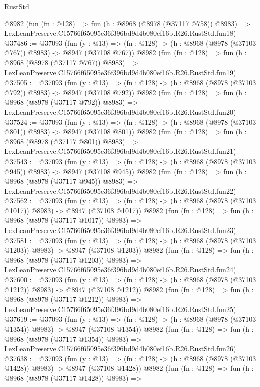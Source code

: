 \begin{lexlean}{RustStd}
\begin{coremodule}
    @8982
    (fun (fn : @128) =>
    fun (h : @8968 (@8978 (@37117 @758)) @8983) =>
    LexLeanPreserve.C15766f65095e36f396bd9d4b080ef16b.R26.RustStd.fun18)
@37486 := @37093
    (fun (y : @13) => (fn : @128) -> (h : @8968 (@8978 (@37103 @767)) @8983) -> @8947 (@37108 @767))
    @8982
    (fun (fn : @128) =>
    fun (h : @8968 (@8978 (@37117 @767)) @8983) =>
    LexLeanPreserve.C15766f65095e36f396bd9d4b080ef16b.R26.RustStd.fun19)
@37505 := @37093
    (fun (y : @13) => (fn : @128) -> (h : @8968 (@8978 (@37103 @792)) @8983) -> @8947 (@37108 @792))
    @8982
    (fun (fn : @128) =>
    fun (h : @8968 (@8978 (@37117 @792)) @8983) =>
    LexLeanPreserve.C15766f65095e36f396bd9d4b080ef16b.R26.RustStd.fun20)
@37524 := @37093
    (fun (y : @13) => (fn : @128) -> (h : @8968 (@8978 (@37103 @801)) @8983) -> @8947 (@37108 @801))
    @8982
    (fun (fn : @128) =>
    fun (h : @8968 (@8978 (@37117 @801)) @8983) =>
    LexLeanPreserve.C15766f65095e36f396bd9d4b080ef16b.R26.RustStd.fun21)
@37543 := @37093
    (fun (y : @13) => (fn : @128) -> (h : @8968 (@8978 (@37103 @945)) @8983) -> @8947 (@37108 @945))
    @8982
    (fun (fn : @128) =>
    fun (h : @8968 (@8978 (@37117 @945)) @8983) =>
    LexLeanPreserve.C15766f65095e36f396bd9d4b080ef16b.R26.RustStd.fun22)
@37562 := @37093
    (fun (y : @13) =>
    (fn : @128) -> (h : @8968 (@8978 (@37103 @1017)) @8983) -> @8947 (@37108 @1017))
    @8982
    (fun (fn : @128) =>
    fun (h : @8968 (@8978 (@37117 @1017)) @8983) =>
    LexLeanPreserve.C15766f65095e36f396bd9d4b080ef16b.R26.RustStd.fun23)
@37581 := @37093
    (fun (y : @13) =>
    (fn : @128) -> (h : @8968 (@8978 (@37103 @1203)) @8983) -> @8947 (@37108 @1203))
    @8982
    (fun (fn : @128) =>
    fun (h : @8968 (@8978 (@37117 @1203)) @8983) =>
    LexLeanPreserve.C15766f65095e36f396bd9d4b080ef16b.R26.RustStd.fun24)
@37600 := @37093
    (fun (y : @13) =>
    (fn : @128) -> (h : @8968 (@8978 (@37103 @1212)) @8983) -> @8947 (@37108 @1212))
    @8982
    (fun (fn : @128) =>
    fun (h : @8968 (@8978 (@37117 @1212)) @8983) =>
    LexLeanPreserve.C15766f65095e36f396bd9d4b080ef16b.R26.RustStd.fun25)
@37619 := @37093
    (fun (y : @13) =>
    (fn : @128) -> (h : @8968 (@8978 (@37103 @1354)) @8983) -> @8947 (@37108 @1354))
    @8982
    (fun (fn : @128) =>
    fun (h : @8968 (@8978 (@37117 @1354)) @8983) =>
    LexLeanPreserve.C15766f65095e36f396bd9d4b080ef16b.R26.RustStd.fun26)
@37638 := @37093
    (fun (y : @13) =>
    (fn : @128) -> (h : @8968 (@8978 (@37103 @1428)) @8983) -> @8947 (@37108 @1428))
    @8982
    (fun (fn : @128) =>
    fun (h : @8968 (@8978 (@37117 @1428)) @8983) =>

\end{coremodule}
\end{lexlean}
